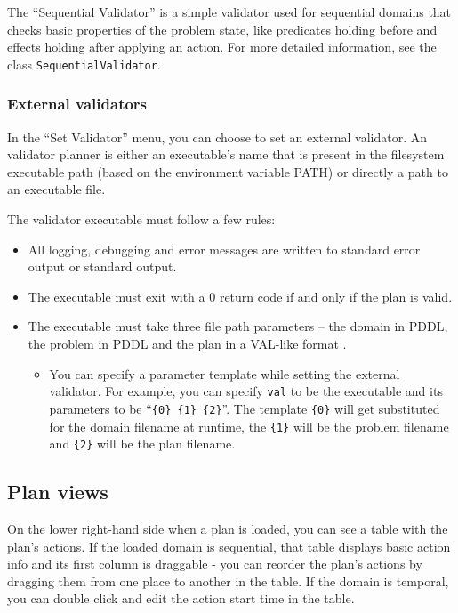 The ``Sequential Validator'' is a simple validator used for sequential domains that checks basic
properties of the problem state, like predicates holding before and effects holding after applying an action.
For more detailed information, see the class \texttt{SequentialValidator}.

\subsubsection*{External validators}
In the ``Set Validator'' menu, you can choose to set an external validator. An validator planner is either an
executable's name that is present in the filesystem executable path (based on the environment variable PATH)
or directly a path to an executable file.

The validator executable must follow a few rules:

\begin{itemize}
\item All logging, debugging and error messages are written to standard error output or standard output.

\item The executable must exit with a 0 return code if and only if the plan is valid.

\item The executable must take three file path parameters -- the domain in PDDL, the problem in PDDL and the plan in a
VAL-like format \citep[Figure~2]{Howey2003}.

\begin{itemize}

\item You can specify a parameter template while setting the external validator.
For example, you can specify \texttt{val} to be the executable and its parameters to be ``\verb+{0} {1} {2}+''.
The template \verb+{0}+ will get substituted for the domain filename at runtime, the \verb+{1}+ will be the problem filename and
\verb+{2}+ will be the plan filename.

\end{itemize}

\end{itemize}

\subsection*{Plan views}
On the lower right-hand side when a plan is loaded, you can see a table with the plan's actions. If the loaded domain
is sequential, that table displays basic action info and its first column is draggable - you can reorder the plan's
actions by dragging them from one place to another in the table. If the domain is temporal, you can double click and
edit the action start time in the table.

